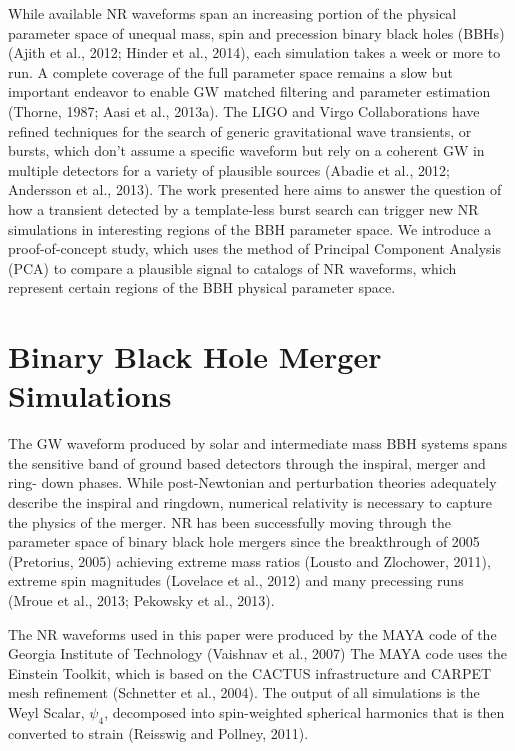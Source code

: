 \documentclass[%
 reprint,
 amsmath,amssymb,
 aps,
]{revtex4-1}
\begin{document}
While available NR waveforms span an increasing portion of the physical parameter space of unequal mass, spin and precession binary black holes (BBHs) (Ajith et al., 2012; Hinder et al., 2014), each simulation takes a week or more to run. A complete coverage of the full parameter space remains a slow but important endeavor to enable GW matched filtering and parameter estimation (Thorne, 1987; Aasi et al., 2013a). The LIGO and Virgo Collaborations have refined techniques for the search of generic gravitational wave transients, or bursts, which don't assume a specific waveform but rely on a coherent GW in multiple detectors for a variety of plausible sources (Abadie et al., 2012; Andersson et al., 2013). The work presented here aims to answer the question of how a transient detected by a template-less burst search can trigger new NR simulations in interesting regions of the BBH parameter space. We introduce a proof-of-concept study, which uses the method of Principal Component Analysis (PCA) to compare a plausible signal to catalogs of NR waveforms, which represent certain regions of the BBH physical parameter space.

\section{Binary Black Hole Merger Simulations}
The GW waveform produced by solar and intermediate mass BBH systems spans the sensitive band of ground based detectors through the inspiral, merger and ring- down phases. While post-Newtonian and perturbation theories adequately describe the inspiral and ringdown, numerical relativity is necessary to capture the physics of the merger. NR has been successfully moving through the parameter space of binary black hole mergers since the breakthrough of 2005 (Pretorius, 2005) achieving extreme mass ratios (Lousto and Zlochower, 2011), extreme spin magnitudes (Lovelace et al., 2012) and many precessing runs (Mroue et al., 2013; Pekowsky et al., 2013).

The NR waveforms used in this paper were produced by the MAYA code of the Georgia Institute of Technology (Vaishnav et al., 2007) The MAYA code uses the Einstein Toolkit, which is based on the CACTUS infrastructure and CARPET mesh refinement (Schnetter et al., 2004). The output of all simulations is the Weyl Scalar, $\psi_4$, decomposed into spin-weighted spherical harmonics that is then converted to strain (Reisswig and Pollney, 2011).
\end{document}
